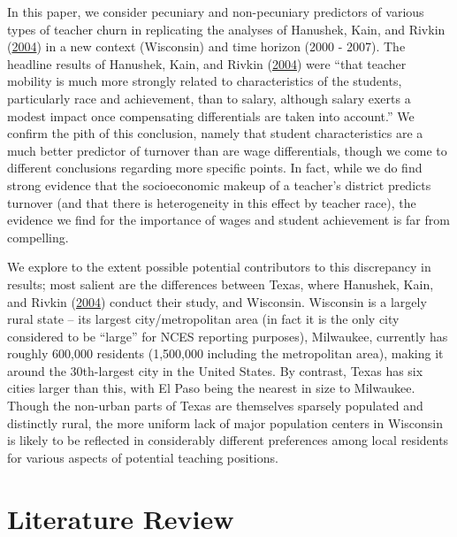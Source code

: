 \documentclass[]{article}
\begin{document}
In this paper, we consider pecuniary and non-pecuniary predictors of
various types of teacher churn in replicating the analyses of Hanushek,
Kain, and Rivkin (\protect\hyperlink{ref-hanushek}{2004}) in a new
context (Wisconsin) and time horizon (2000 - 2007). The headline results
of Hanushek, Kain, and Rivkin (\protect\hyperlink{ref-hanushek}{2004})
were ``that teacher mobility is much more strongly related to
characteristics of the students, particularly race and achievement, than
to salary, although salary exerts a modest impact once compensating
differentials are taken into account.'' We confirm the pith of this
conclusion, namely that student characteristics are a much better
predictor of turnover than are wage differentials, though we come to
different conclusions regarding more specific points. In fact, while we
do find strong evidence that the socioeconomic makeup of a teacher's
district predicts turnover (and that there is heterogeneity in this
effect by teacher race), the evidence we find for the importance of
wages and student achievement is far from compelling.

We explore to the extent possible potential contributors to this
discrepancy in results; most salient are the differences between Texas,
where Hanushek, Kain, and Rivkin
(\protect\hyperlink{ref-hanushek}{2004}) conduct their study, and
Wisconsin. Wisconsin is a largely rural state -- its largest
city/metropolitan area (in fact it is the only city considered to be
``large'' for NCES reporting purposes), Milwaukee, currently has roughly
600,000 residents (1,500,000 including the metropolitan area), making it
around the 30th-largest city in the United States. By contrast, Texas
has six cities larger than this, with El Paso being the nearest in size
to Milwaukee. Though the non-urban parts of Texas are themselves
sparsely populated and distinctly rural, the more uniform lack of major
population centers in Wisconsin is likely to be reflected in
considerably different preferences among local residents for various
aspects of potential teaching positions.

\section{Literature Review}\label{literature-review}
\end{document}
